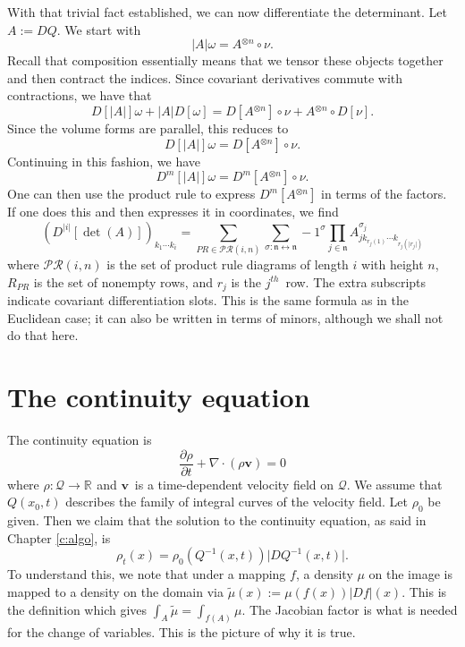 \documentclass[11pt]{article}
\theoremstyle{remark}
\begin{document}
With that trivial fact established, we can now differentiate the
determinant. Let $A \ensuremath{:=} DQ$. We start with 
\[
\ensuremath{\lvert {A} \rvert}  \omega  = A\ensuremath{^{\otimes n} } \circ \nu.
\]
Recall that composition essentially means that we tensor these objects
together and then contract the indices. Since covariant derivatives
commute  with contractions, we have that
\[
D[\ensuremath{\lvert {A} \rvert}]  \omega + \ensuremath{\lvert {A} \rvert}  D[\omega]
=
D[A\ensuremath{^{\otimes n} }] \circ \nu +  A\ensuremath{^{\otimes n} } \circ D[\nu].
\]
Since the volume forms are parallel, this reduces to 
\[
D[\ensuremath{\lvert {A} \rvert}] \omega = D[A\ensuremath{^{\otimes n} }] \circ \nu.
\]
Continuing in this fashion, we have
\[
D^m [\ensuremath{\lvert {A} \rvert}]  \omega = D^m[A\ensuremath{^{\otimes n} }] \circ \nu.
\]
One can then use the product rule to express $D^m[A\ensuremath{^{\otimes n} }]$ in terms
of the factors. If one does this and then expresses it in coordinates,
we find
\[
(D^{\ensuremath{\lvert {i} \rvert}} [\det(A)])_{k_1\cdots k_i} = 
\sum_{\ensuremath{PR} \in \ensuremath{\mathcal{\ensuremath{PR}}} (i, n)} 
 \sum_{\sigma : \ensuremath{\mathfrak{n}} \leftrightarrow \ensuremath{\mathfrak{n}}}
-1^{\sigma}
\prod_{j \in \ensuremath{\mathfrak{n}}} A^{\sigma_j}_{j k_{r_j(1)} \cdots k_{r_j(\ensuremath{\lvert {r_j} \rvert})}}
\]
where $\ensuremath{\mathcal{\ensuremath{PR}}}(i, n)$ is the set of 
 product rule diagrams of length $i$ with height $n$, $R_{\ensuremath{PR}}$ is the set of
nonempty rows, and   $r_j$ is the \ensuremath{{j}^{th}}\ row. The extra subscripts
 indicate covariant differentiation slots. This is the same
 formula as in the Euclidean case; it can also be written in terms of
 minors, although we shall not do that here.  


\section{The continuity equation}


The continuity equation is 
\[
\ensuremath{\frac{\partial {\ensuremath{\rho}}}{\partial {t}}} + \nabla \cdot (\ensuremath{\rho}  \ensuremath{\boldsymbol{v}}) =0
\]
where $\ensuremath{\rho} : \ensuremath{\mathcal{Q}} \to \ensuremath{\mathbb{R}^{}}$ and \ensuremath{\boldsymbol{v}}\ is a time-dependent
velocity field on \ensuremath{\mathcal{Q}}. We assume that $Q(x_0,t)$ describes the
family of integral curves of the velocity field. 
Let $\ensuremath{\rho}_0$ be given. Then we claim that the solution to the
continuity equation, as said in Chapter \ref{c:algo}, 
is
\[
\ensuremath{\rho}_t(x) = \ensuremath{\rho}_0(Q^{-1}(x, t))\ensuremath{\lvert {DQ^{-1} (x,t)} \rvert}.
\]
To understand this, we note that under a mapping $f$, a density $\mu$ on the
image is mapped to a density on the domain via
$ \tilde{\mu}(x) \ensuremath{:=} \mu(f(x))\ensuremath{\lvert {Df} \rvert}(x)$. This is the definition
which gives $\int_A \tilde{\mu} = \int_{f(A)} \mu$. The Jacobian
factor is what is needed for the change of variables. This is the
picture of why it is true.
\end{document}
